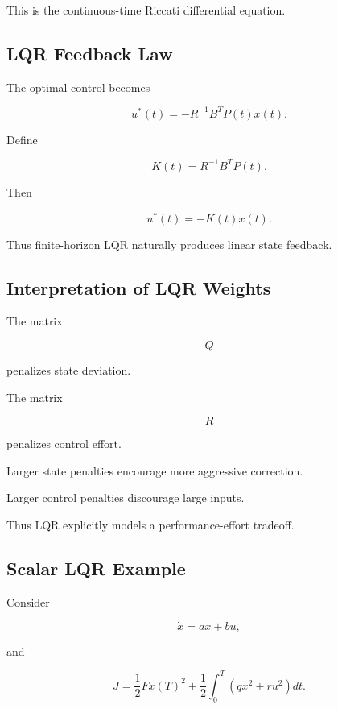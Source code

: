 This is the continuous-time Riccati differential equation.

\subsection{LQR Feedback Law}
\label{subsec:lqr-feedback-law}

The optimal control becomes

\[
\boxed{
u^*(t)
=
-
R^{-1}
B^T
P(t)
x(t).
}
\]

Define

\[
\boxed{
K(t)
=
R^{-1}B^TP(t).
}
\]

Then

\[
\boxed{
u^*(t)
=
-K(t)x(t).
}
\]

Thus finite-horizon LQR naturally produces linear state feedback.

\subsection{Interpretation of LQR Weights}
\label{subsec:lqr-weight-interpretation}

The matrix

\[
Q
\]

penalizes state deviation.

The matrix

\[
R
\]

penalizes control effort.

Larger state penalties encourage more aggressive correction.

Larger control penalties discourage large inputs.

Thus LQR explicitly models a performance-effort tradeoff.

\subsection{Scalar LQR Example}
\label{subsec:scalar-lqr-example}

Consider

\[
\dot{x}
=
ax+bu,
\]

and

\[
J
=
\frac12Fx(T)^2
+
\frac12
\int_0^T
\left(
qx^2+ru^2
\right)dt.
\]


